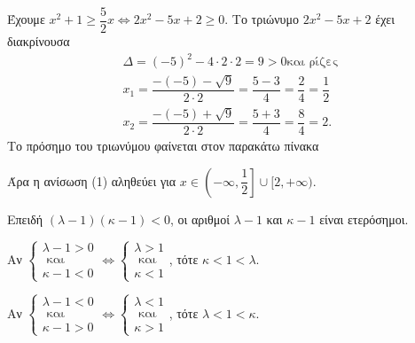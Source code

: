 
\begin{alist}
\item Έχουμε $x^2 + 1 \ge \dfrac{5}{2}x \Leftrightarrow 2x^2 - 5x + 2 \ge 0$.
Το τριώνυμο $2x^2 - 5x + 2$ έχει διακρίνουσα
\begin{gather*}
\Delta = (-5)^2 - 4 \cdot 2 \cdot 2 = 9 > 0\text{και ρίζες} \\
x_1 = \dfrac{-(-5) - \sqrt{9}}{2 \cdot 2} = \dfrac{5 - 3}{4} = \dfrac{2}{4} = \dfrac{1}{2} \\
x_2 = \dfrac{-(-5) + \sqrt{9}}{2 \cdot 2} = \dfrac{5 + 3}{4} = \dfrac{8}{4} = 2.
\end{gather*}
Το πρόσημο του τριωνύμου φαίνεται στον παρακάτω πίνακα

\begin{center}
\end{center}

Άρα η ανίσωση (1) αληθεύει για $x \in \left(-\infty, \dfrac{1}{2}\right] \cup [2, +\infty)$.

\item Επειδή $(\lambda - 1)(\kappa - 1) < 0$, οι αριθμοί $\lambda - 1$ και $\kappa - 1$ είναι ετερόσημοι.

\begin{rlist}
\item 
Αν $\begin{cases} \lambda - 1 > 0 \\ \text{ και} \\ \kappa - 1 < 0 \end{cases} \Leftrightarrow \begin{cases} \lambda > 1 \\ \text{ και} \\ \kappa < 1 \end{cases}$, τότε $\kappa < 1 < \lambda$.

Αν $\begin{cases} \lambda - 1 < 0 \\ \text{ και} \\ \kappa - 1 > 0 \end{cases} \Leftrightarrow \begin{cases} \lambda < 1 \\ \text{ και} \\ \kappa > 1 \end{cases}$, τότε $\lambda < 1 < \kappa$.


\end{rlist}
\end{alist}
